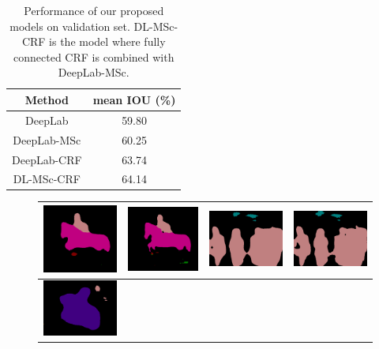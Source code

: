 \begin{table}
  \centering
  \begin{tabular}{c | c}
    Method      & mean IOU (\%) \\
    \hline
    DeepLab     & 59.80 \\
    DeepLab-MSc & 60.25 \\
    DeepLab-CRF & 63.74 \\
    DL-MSc-CRF  & 64.14 \\
  \end{tabular}
  \caption{Performance of our proposed models on validation set. DL-MSc-CRF is the model where fully connected CRF is combined with DeepLab-MSc.}
  \label{tb:valIOU}
\end{table}

\begin{figure}[ht]
  \centering
  \begin{tabular}{c c | c c}
      \includegraphics[height=0.14\linewidth]{fig/boundary_refine/vgg128noup_2007_000783.png} &
      \includegraphics[height=0.14\linewidth]{fig/boundary_refine/vgg128ms_2007_000783.png} &
      \includegraphics[height=0.14\linewidth]{fig/boundary_refine/vgg128noup_2007_001284.png} &
      \includegraphics[height=0.14\linewidth]{fig/boundary_refine/vgg128ms_2007_001284.png} \\
      \hline
      \includegraphics[height=0.12\linewidth]{fig/boundary_refine/vgg128noup_2007_001239.png} &

\end{tabular}
\end{figure}
